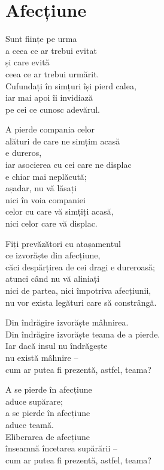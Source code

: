 
\chapter{Afecțiune}


Sunt ființe pe urma\\
a ceea ce ar trebui evitat\\
și care evită\\
ceea ce ar trebui urmărit.\\
Cufundați în simțuri își pierd calea,\\
iar mai apoi îi invidiază\\
pe cei ce cunosc adevărul.


A pierde compania celor\\
alături de care ne simțim acasă\\
e dureros,\\
iar asocierea cu cei care ne displac\\
e chiar mai neplăcută;\\
așadar, nu vă lăsați\\
nici în voia companiei\\
celor cu care vă simțiți acasă,\\
nici celor care vă displac.


Fiți prevăzători cu atașamentul\\
ce izvorăște din afecțiune,\\
căci despărțirea de cei dragi e dureroasă;\\
atunci când nu vă aliniați\\
nici de partea, nici împotriva afecțiunii,\\
nu vor exista legături care să constrângă.


Din îndrăgire izvorăște mâhnirea.\\
Din îndrăgire izvorăște teama de a pierde.\\
Iar dacă insul nu îndrăgește\\
nu există mâhnire –\\
cum ar putea fi prezentă, astfel, teama?


A se pierde în afecțiune\\
aduce supărare;\\
a se pierde în afecțiune\\
aduce teamă.\\
Eliberarea de afecțiune\\
înseamnă încetarea supărării –\\
cum ar putea fi prezentă, astfel, teama?


